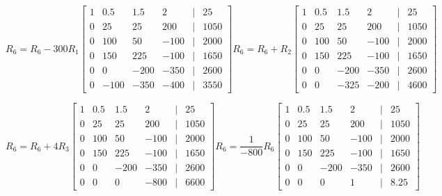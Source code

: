 \documentclass[11pt]{article}
\begin{document}
\begin{enumerate}
\begin{enumerate}
\[
    R_6 = R_6 - 300R_1
    \begin{bmatrix}
        1 & 0.5 & 1.5 & 2 &|& 25 \\
        0 & 25 & 25 & 200 &|& 1050 \\
        0 & 100 & 50 & -100 &|& 2000 \\
        0 & 150 & 225 & -100 &|& 1650 \\
        0 & 0 & -200 & -350 &|& 2600 \\
        0 & -100 & -350 & -400 &|& 3550
    \end{bmatrix}
    R_6 = R_6 + R_2
    \begin{bmatrix}
        1 & 0.5 & 1.5 & 2 &|& 25 \\
        0 & 25 & 25 & 200 &|& 1050 \\
        0 & 100 & 50 & -100 &|& 2000 \\
        0 & 150 & 225 & -100 &|& 1650 \\
        0 & 0 & -200 & -350 &|& 2600 \\
        0 & 0 & -325 & -200 &|& 4600
    \end{bmatrix}
\]

\[
    R_6 = R_6 + 4R_3
    \begin{bmatrix}
        1 & 0.5 & 1.5 & 2 &|& 25 \\
        0 & 25 & 25 & 200 &|& 1050 \\
        0 & 100 & 50 & -100 &|& 2000 \\
        0 & 150 & 225 & -100 &|& 1650 \\
        0 & 0 & -200 & -350 &|& 2600 \\
        0 & 0 & 0 & -800 &|& 6600
    \end{bmatrix}
    R_6 = \frac{1}{-800}R_6
    \begin{bmatrix}
        1 & 0.5 & 1.5 & 2 &|& 25 \\
        0 & 25 & 25 & 200 &|& 1050 \\
        0 & 100 & 50 & -100 &|& 2000 \\
        0 & 150 & 225 & -100 &|& 1650 \\
        0 & 0 & -200 & -350 &|& 2600 \\
        0 & 0 & 0 & 1 &|& 8.25
    \end{bmatrix}
\]


\end{enumerate}
\end{enumerate}
\end{document}
